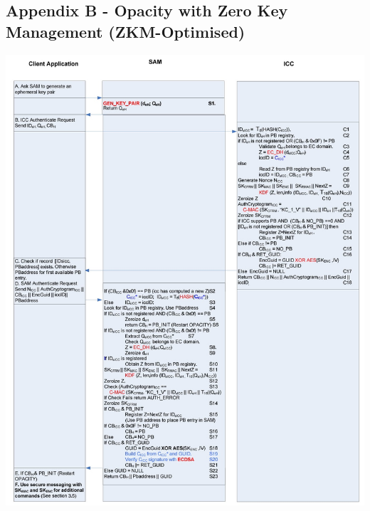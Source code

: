 \documentclass[12pt]{article}
\begin{document}
\subsection{Appendix B - Opacity with Zero Key Management (ZKM-Optimised)}
\includegraphics[scale=0.4]{appendix/opacity-zkm-opt}
\end{document}
